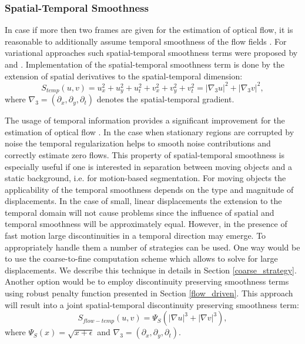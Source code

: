 \subsubsection{Spatial-Temporal Smoothness}
\label{spatial_temporal}

In case if more then two frames are given for the estimation of optical flow, it is reasonable to additionally assume temporal smoothness of the flow fields \cite{Murray87, Black91}. For variational approaches such spatial-temporal smoothness terms were proposed by \cite{Nagel90} and \cite{Weickert2001b}.
Implementation of the spatial-temporal smoothness term is done by the extension of spatial derivatives to the spatial-temporal dimension:
$$ S_{temp}(u,v) = u_{x}^2 + u_{y}^2 + u_{t}^2+ v_{x}^2 + v_{y}^2 + v_{t}^2 = |\nabla_3 u|^2 + |\nabla_3 v|^2,$$
where $\nabla_3 = (\partial_{x}, \partial_{y}, \partial_{t})$ denotes the spatial-temporal gradient.


The usage of temporal information provides a significant improvement for the estimation of optical flow \cite{Brox04, HarmonyFlow}. In the case when stationary regions are corrupted by noise the temporal regularization helps to smooth noise contributions and correctly estimate zero flows. This property of spatial-temporal smoothness is especially useful if one is interested in separation between moving objects and a static background, i.e. for motion-based segmentation.
For moving objects the applicability of the temporal smoothness depends on the type and magnitude of displacements. In the case of small, linear displacements the extension to the temporal domain will not cause problems since the influence of spatial and temporal smoothness will be approximately equal. However, in the presence of fast motion large discontinuities in a temporal direction may emerge. To appropriately handle them a number of strategies can be used. One way would be to use the coarse-to-fine computation scheme which allows to solve for large displacements. We describe this technique in details in Section \ref{coarse_strategy}. Another option would be to employ discontinuity preserving smoothness terms using robust penalty function presented in Section \ref{flow_driven}. This approach will result into a joint spatial-temporal discontinuity preserving smoothness term:
$$ S_{flow-temp}(u,v) = \Psi_{S}(|\nabla u|^3 + |\nabla v|^3), $$
where $\Psi_{S}(x) = \sqrt{x + \epsilon}$  and  $\nabla_3 = (\partial_{x}, \partial_{y}, \partial_{t})$.

